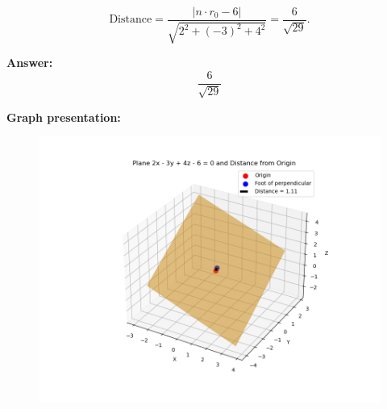 \documentclass[journal]{IEEEtran}
\begin{document}
\begin{equation}
\text{Distance} = \frac{|n \cdot {r}_0 - 6|}{\sqrt{2^2 + (-3)^2 + 4^2}} 
= \frac{6}{\sqrt{29}}.
\end{equation}

\textbf{Answer:}
\begin{equation}
\boxed{\frac{6}{\sqrt{29}}}
\end{equation}

\textbf{Graph presentation:}
\begin{figure}[H]
\begin{center}
\includegraphics[width=0.6\columnwidth]{Figs/fig7.png}
\end{center}
\caption{}
\label{fig:Fig}
\end{figure}
\end{document}
